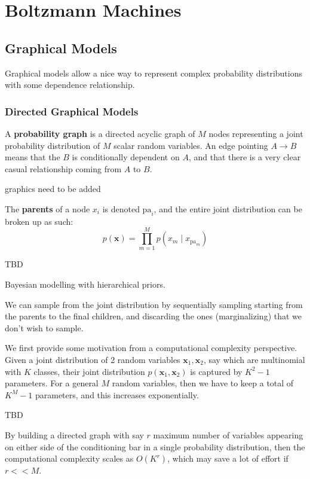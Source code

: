 \section{Boltzmann Machines} 

\subsection{Graphical Models}
  Graphical models allow a nice way to represent complex probability distributions with some dependence relationship. 

  \subsubsection{Directed Graphical Models}

    \begin{definition}  
    A \textbf{probability graph} is a directed acyclic graph of $M$ nodes representing a joint probability distribution of $M$ scalar random variables. An edge pointing $A \rightarrow B$ means that the $B$ is conditionally dependent on $A$, and that there is a very clear casual relationship coming from $A$ to $B$. 
    \begin{center}
      graphics need to be added
    \end{center}
    The \textbf{parents} of a node $x_i$ is denoted $\mathrm{pa}_i$, and the entire joint distribution can be broken up as such: 
    \[p(\mathbf{x}) = \prod_{m=1}^M p(x_m \mid x_{\mathrm{pa}_m})\]
    \end{definition}


    \begin{example}
      TBD
    \end{example} 


    Bayesian modelling with hierarchical priors. 

    \begin{definition} 
    We can sample from the joint distribution by sequentially sampling starting from the parents to the final children, and discarding the ones (marginalizing) that we don't wish to sample. 
    \end{definition}


    \begin{example}
    We first provide some motivation from a computational complexity perspective. Given a joint distribution of 2 random variables $\mathbf{x}_1, \mathbf{x}_2$, say which are multinomial with $K$ classes, their joint distribution $p(\mathbf{x}_1, \mathbf{x}_2)$ is captured by $K^2 - 1$ parameters. For a general $M$ random variables, then we have to keep a total of $K^M - 1$ parameters, and this increases exponentially. 
    \begin{center}
      TBD
    \end{center}
    By building a directed graph with say $r$ maximum number of variables appearing on either side of the conditioning bar in a single probability distribution, then the computational complexity scales as $O(K^r)$, which may save a lot of effort if $r << M$. 
    \end{example}

